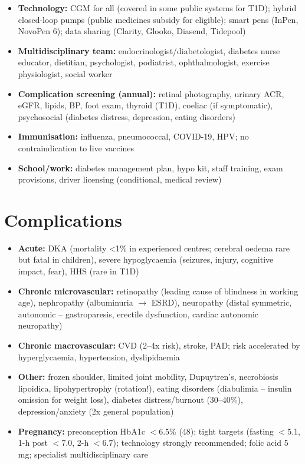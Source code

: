 \begin{itemize}
    \item \textbf{Technology:} CGM for all (covered in some public systems for T1D); hybrid closed-loop pumps (public medicines subsidy for eligible); smart pens (InPen, NovoPen 6); data sharing (Clarity, Glooko, Diasend, Tidepool)
    \item \textbf{Multidisciplinary team:} endocrinologist/diabetologist, diabetes nurse educator, dietitian, psychologist, podiatrist, ophthalmologist, exercise physiologist, social worker
    \item \textbf{Complication screening (annual):} retinal photography, urinary ACR, eGFR, lipids, BP, foot exam, thyroid (T1D), coeliac (if symptomatic), psychosocial (diabetes distress, depression, eating disorders)
    \item \textbf{Immunisation:} influenza, pneumococcal, COVID-19, HPV; no contraindication to live vaccines
    \item \textbf{School/work:} diabetes management plan, hypo kit, staff training, exam provisions, driver licensing (conditional, medical review)
\end{itemize}

\section*{Complications}
\begin{itemize}
    \item \textbf{Acute:} DKA (mortality <1\% in experienced centres; cerebral oedema rare but fatal in children), severe hypoglycaemia (seizures, injury, cognitive impact, fear), HHS (rare in T1D)
    \item \textbf{Chronic microvascular:} retinopathy (leading cause of blindness in working age), nephropathy (albuminuria $\to$ ESRD), neuropathy (distal symmetric, autonomic -- gastroparesis, erectile dysfunction, cardiac autonomic neuropathy)
    \item \textbf{Chronic macrovascular:} CVD (2--4x risk), stroke, PAD; risk accelerated by hyperglycaemia, hypertension, dyslipidaemia
    \item \textbf{Other:} frozen shoulder, limited joint mobility, Dupuytren's, necrobiosis lipoidica, lipohypertrophy (rotation!), eating disorders (diabulimia -- insulin omission for weight loss), diabetes distress/burnout (30--40\%), depression/anxiety (2x general population)
    \item \textbf{Pregnancy:} preconception HbA1c $<$6.5\% (48); tight targets (fasting $<$5.1, 1-h post $<$7.0, 2-h $<$6.7); technology strongly recommended; folic acid 5 mg; specialist multidisciplinary care
\end{itemize}

